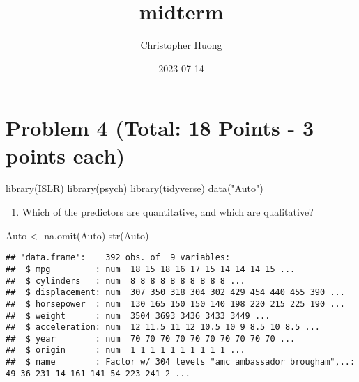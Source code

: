 \documentclass[
]{article}
\title{midterm}
\author{Christopher Huong}
\date{2023-07-14}
\newenvironment{Shaded}{\begin{snugshade}}{\end{snugshade}}
\newcommand{\FunctionTok}[1]{\textcolor[rgb]{0.00,0.00,0.00}{#1}}
\newcommand{\NormalTok}[1]{#1}
\newcommand{\OtherTok}[1]{\textcolor[rgb]{0.56,0.35,0.01}{#1}}
\newcommand{\SpecialCharTok}[1]{\textcolor[rgb]{0.00,0.00,0.00}{#1}}
\newcommand{\StringTok}[1]{\textcolor[rgb]{0.31,0.60,0.02}{#1}}
\providecommand{\tightlist}{%
  \setlength{\itemsep}{0pt}\setlength{\parskip}{0pt}}
\begin{document}
\maketitle

\hypertarget{problem-4-total-18-points---3-points-each}{%
\section{Problem 4 (Total: 18 Points - 3 points
each)}\label{problem-4-total-18-points---3-points-each}}

\begin{Shaded}
\begin{Highlighting}[]
\FunctionTok{library}\NormalTok{(ISLR)}
\FunctionTok{library}\NormalTok{(psych)}
\FunctionTok{library}\NormalTok{(tidyverse)}
\FunctionTok{data}\NormalTok{(}\StringTok{"Auto"}\NormalTok{)}
\end{Highlighting}
\end{Shaded}

\begin{enumerate}
\def\labelenumi{(\alph{enumi})}
\tightlist
\item
  Which of the predictors are quantitative, and which are qualitative?
\end{enumerate}

\begin{Shaded}
\begin{Highlighting}[]
\NormalTok{Auto }\OtherTok{\textless{}{-}} \FunctionTok{na.omit}\NormalTok{(Auto)}
\FunctionTok{str}\NormalTok{(Auto)}
\end{Highlighting}
\end{Shaded}

\begin{verbatim}
## 'data.frame':    392 obs. of  9 variables:
##  $ mpg         : num  18 15 18 16 17 15 14 14 14 15 ...
##  $ cylinders   : num  8 8 8 8 8 8 8 8 8 8 ...
##  $ displacement: num  307 350 318 304 302 429 454 440 455 390 ...
##  $ horsepower  : num  130 165 150 150 140 198 220 215 225 190 ...
##  $ weight      : num  3504 3693 3436 3433 3449 ...
##  $ acceleration: num  12 11.5 11 12 10.5 10 9 8.5 10 8.5 ...
##  $ year        : num  70 70 70 70 70 70 70 70 70 70 ...
##  $ origin      : num  1 1 1 1 1 1 1 1 1 1 ...
##  $ name        : Factor w/ 304 levels "amc ambassador brougham",..: 49 36 231 14 161 141 54 223 241 2 ...
\end{verbatim}

\begin{Shaded}
\end{Shaded}
\end{document}
